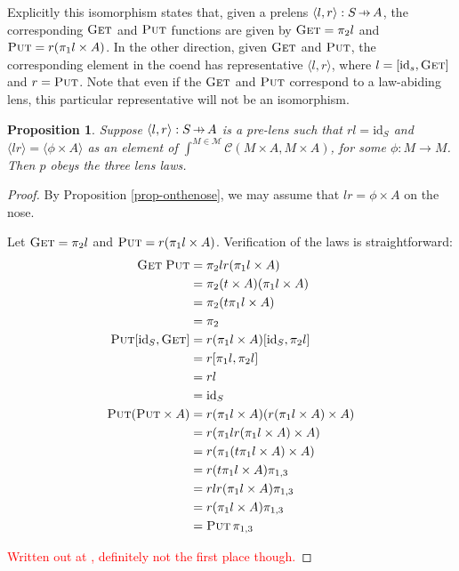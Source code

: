 \documentclass[11pt,a4paper]{article}
\theoremstyle{plain}
\newtheorem{proposition}[theorem]{Proposition}
\theoremstyle{definition}
\newcommand{\C}{\mathscr{C}}
\newcommand{\M}{\mathscr{M}}
\newcommand{\id}{\mathrm{id}}
\newcommand{\fget}{\textsc{Get}}
\newcommand{\fput}{\textsc{Put}}
\newcommand{\hto}{\ensuremath{\,\mathaccent\shortmid\rightarrow\,}}
\newcommand{\todo}[1]{\textcolor{red}{\small #1}}
\begin{document}
Explicitly this isomorphism states that, given a prelens $\langle l, r \rangle : S \hto A$, the corresponding $\fget$ and $\fput$ functions are given by $\fget = \pi_2 l$ and $\fput = r (\pi_1 l \times A)$. In the other direction, given $\fget$ and $\fput$, the corresponding element in the coend has representative $\langle l, r \rangle$, where $l = [\id_s, \fget]$ and $r = \fput$. Note that even if the $\fget$ and $\fput$ correspond to a law-abiding lens, this particular representative will not be an isomorphism.

\begin{proposition}
\label{prop-OpticImpliesLensLaws}
Suppose $\langle l, r \rangle : S \hto A$ is a pre-lens such that $rl = \id_S$ and $\langle lr \rangle = \langle \phi \times A \rangle$ as an element of $\int^{M \in \M} \C(M \times A, M \times A)$, for some $\phi : M \to M$. Then $p$ obeys the three lens laws.
\end{proposition}
\begin{proof}
By Proposition \ref{prop-onthenose}, we may assume that $lr = \phi \times A$ on the nose.

Let $\fget = \pi_2 l$ and $\fput = r (\pi_1 l \times A)$. Verification of the laws is straightforward:
\begin{align*}
\fget \; \fput 
&= \pi_2 l r (\pi_1 l \times A) \\
&= \pi_2 (t \times A) (\pi_1 l \times A) \\
&= \pi_2 (t \pi_1 l \times A) \\
&= \pi_2 \\
\fput [\id_S, \fget] 
&= r (\pi_1 l \times A) [\id_S, \pi_2 l] \\
&= r [\pi_1 l, \pi_2 l] \\
&= rl \\
&= \id_S \\
\fput (\fput \times A) 
&= r (\pi_1 l \times A) (r (\pi_1 l \times A) \times A) \\
&= r (\pi_1 l  r (\pi_1 l \times A) \times A) \\
&= r (\pi_1 (t\pi_1 l \times A) \times A) \\
&= r (t\pi_1 l \times A) \pi_{1,3} \\
&= r lr(\pi_1 l \times A) \pi_{1,3} \\
&= r(\pi_1 l \times A) \pi_{1,3} \\
&= \fput \, \pi_{1, 3}
\end{align*}

\todo{Written out at \cite{IsomorphismLensesPost}, definitely not the first place though.}
\end{proof}
\end{document}
